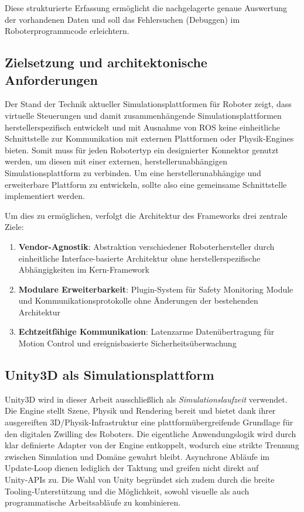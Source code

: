 Diese strukturierte Erfassung ermöglicht die nachgelagerte genaue Auswertung der
vorhandenen Daten und soll das Fehlersuchen (Debuggen) im Roboterprogrammcode
erleichtern.

\subsection{Zielsetzung und architektonische Anforderungen}
Der Stand der Technik aktueller Simulationsplattformen für Roboter zeigt, dass
virtuelle Steuerungen und damit zusammenhängende Simulationsplattformen
herstellerspezifisch entwickelt und mit Ausnahme von ROS keine einheitliche
Schnittstelle zur Kommunikation mit externen Plattformen oder Physik-Engines
bieten. Somit muss für jeden Robotertyp ein designierter Konnektor genutzt
werden, um diesen mit einer externen, herstellerunabhängigen
Simulationsplattform
zu verbinden. Um eine herstellerunabhängige und erweiterbare Plattform zu
entwickeln, sollte also eine gemeinsame Schnittstelle implementiert werden.

Um dies zu ermöglichen, verfolgt die Architektur des Frameworks drei
zentrale Ziele:
\begin{enumerate}
  \item \textbf{Vendor-Agnostik}: Abstraktion verschiedener
    Roboterhersteller durch einheitliche Interface-basierte
    Architektur ohne herstellerspezifische Abhängigkeiten im Kern-Framework

  \item \textbf{Modulare Erweiterbarkeit}: Plugin-System für Safety
    Monitoring Module und Kommunikationsprotokolle ohne Änderungen
    der bestehenden Architektur

  \item \textbf{Echtzeitfähige Kommunikation}: Latenzarme
    Datenübertragung für Motion Control und ereignisbasierte
    Sicherheitsüberwachung
\end{enumerate}

\subsection{Unity3D als Simulationsplattform}

Unity3D wird in dieser Arbeit ausschließlich als
\emph{Simulations\-laufzeit} verwendet.
Die Engine stellt Szene, Physik und Rendering bereit und bietet dank
ihrer ausgereiften
3D/Physik‑Infrastruktur eine plattformübergreifende Grundlage für den
digitalen Zwilling des Roboters. Die eigentliche
Anwendungslogik wird durch klar definierte Adapter von der Engine entkoppelt,
wodurch eine strikte Trennung zwischen Simulation und Domäne gewahrt bleibt.
Asynchrone Abläufe im Update‑Loop dienen lediglich der Taktung und greifen
nicht direkt auf Unity‑APIs zu. Die Wahl von Unity begründet sich zudem durch
die breite Tooling‑Unterstützung und die Möglichkeit, sowohl visuelle als auch
programmatische Arbeitsabläufe zu kombinieren.

